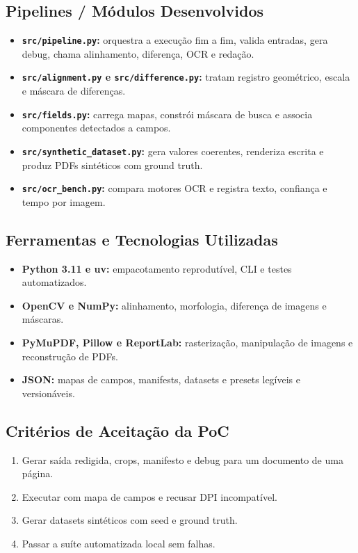 \documentclass[12pt,a4paper]{article}
\begin{document}
\subsection{Pipelines / Módulos Desenvolvidos}

\begin{itemize}
    \item \textbf{\texttt{src/pipeline.py}:} orquestra a execução fim a fim, valida entradas, gera debug, chama alinhamento, diferença, OCR e redação.
    \item \textbf{\texttt{src/alignment.py} e \texttt{src/difference.py}:} tratam registro geométrico, escala e máscara de diferenças.
    \item \textbf{\texttt{src/fields.py}:} carrega mapas, constrói máscara de busca e associa componentes detectados a campos.
    \item \textbf{\texttt{src/synthetic\_dataset.py}:} gera valores coerentes, renderiza escrita e produz PDFs sintéticos com ground truth.
    \item \textbf{\texttt{src/ocr\_bench.py}:} compara motores OCR e registra texto, confiança e tempo por imagem.
\end{itemize}

\subsection{Ferramentas e Tecnologias Utilizadas}

\begin{itemize}
    \item \textbf{Python 3.11 e uv:} empacotamento reprodutível, CLI e testes automatizados.
    \item \textbf{OpenCV e NumPy:} alinhamento, morfologia, diferença de imagens e máscaras.
    \item \textbf{PyMuPDF, Pillow e ReportLab:} rasterização, manipulação de imagens e reconstrução de PDFs.
    \item \textbf{JSON:} mapas de campos, manifests, datasets e presets legíveis e versionáveis.
\end{itemize}

\subsection{Critérios de Aceitação da PoC}

\begin{enumerate}
    \item{} Gerar saída redigida, crops, manifesto e debug para um documento de uma página.
    \item{} Executar com mapa de campos e recusar DPI incompatível.
    \item{} Gerar datasets sintéticos com seed e ground truth.
    \item{} Passar a suíte automatizada local sem falhas.
\end{enumerate}
\end{document}
